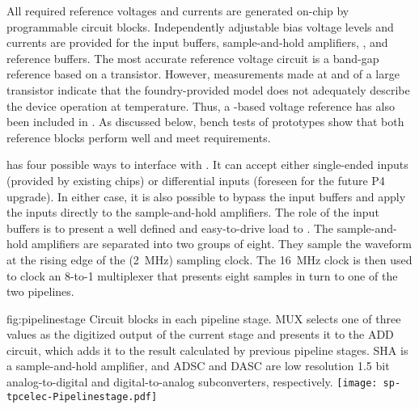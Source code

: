 All required reference voltages and currents are generated on-chip by programmable
circuit blocks. Independently adjustable bias voltage levels and currents are provided for the
input buffers, sample-and-hold amplifiers, , and 
reference buffers.
The most accurate reference voltage circuit is a band-gap reference
based on a  transistor.  However, measurements made at  and
 of a large  transistor indicate that the foundry-provided  model
does not adequately describe the device operation at \lar temperature.  Thus,
a -based voltage reference has also been included in .
As discussed below, bench tests of  prototypes show that both reference blocks 
perform well and meet requirements.

 has four possible ways to interface with .  It
can accept either single-ended inputs (provided by existing 
chips) or differential inputs (foreseen for the future  P4 upgrade).
In either case, it is also possible to bypass the input buffers and apply the inputs directly
to the sample-and-hold amplifiers. The role of the input buffers is to present a well defined
and easy-to-drive load to .  The sample-and-hold amplifiers are separated
into two groups of eight. They sample the waveform at the rising edge of the
(\SI{2}{MHz}) sampling clock. The \SI{16}{MHz} clock is then
used to clock an \num{8}-to-\num{1} multiplexer that presents eight samples in 
turn to one of the two  pipelines.

\begin{dunefigure}
{fig:pipelinestage}
{Circuit blocks in each  pipeline stage. MUX selects one of three values
as the digitized output of the current stage and presents it to the ADD circuit, which 
adds it to the result calculated by previous pipeline stages.
SHA is a sample-and-hold amplifier, and
ADSC and DASC are low resolution 1.5 bit analog-to-digital and digital-to-analog 
subconverters, respectively.}
\texttt{[image: sp-tpcelec-Pipelinestage.pdf]}
\end{dunefigure}

